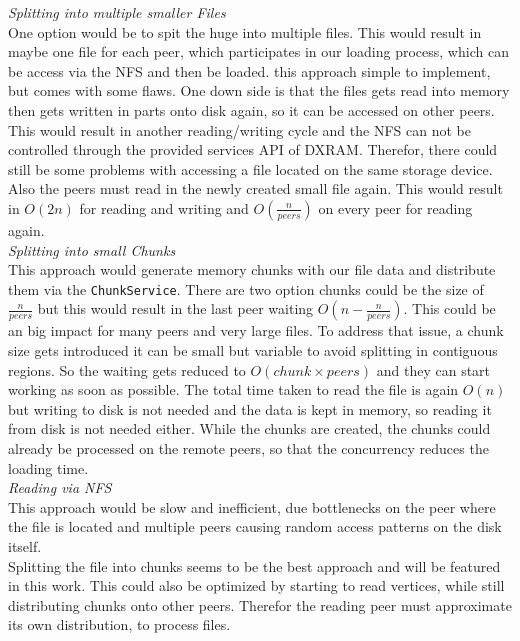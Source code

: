 	\textit{Splitting into multiple smaller Files}\\
	One option would be to spit the huge into multiple files. This would result in maybe one file for each peer, which participates in our loading process, which can be access via the NFS and then be loaded. this approach simple to implement, but comes with some flaws. One down side is that the files gets read into memory then gets written in parts onto disk again, so it can be accessed on other peers. This would result in another reading/writing cycle and the NFS can not be controlled through the provided services API of DXRAM. Therefor, there could still be some problems with accessing a file located on the same storage device. Also the peers must read in the newly created small file again. This would result in $O(2n)$ for reading and writing and $O(\frac{n}{peers})$ on every peer for reading again.\\
	
	\textit{Splitting into small Chunks}\\
	This approach would generate memory chunks with our file data and distribute them via the \texttt{ChunkService}. There are two option chunks could be the size of $\frac{n}{peers}$ but this would result in the last peer waiting $O(n-\frac{n}{peers})$. This could be an big impact for many peers and very large files. To address that issue, a chunk size gets introduced  it can be small but variable to avoid splitting in contiguous regions. So the waiting gets reduced to $O(chunk \times peers)$ and they can start working as soon as possible. The total time taken to read the file is again $O(n)$ but writing to disk is not needed and the data is kept in memory, so reading it from disk is not needed either.
	While the chunks are created, the chunks could already be processed on the remote peers, so that the concurrency reduces the loading time.\\
	
	\textit{Reading via NFS}\\
	This approach would be slow and inefficient, due bottlenecks on the peer where the file is located and multiple peers causing random access patterns on the disk itself.\\

Splitting the file into chunks seems to be the best approach and will be featured in this work. This could also be optimized by starting to read vertices, while still distributing chunks onto other peers. Therefor the reading peer must approximate its own distribution, to process files.

